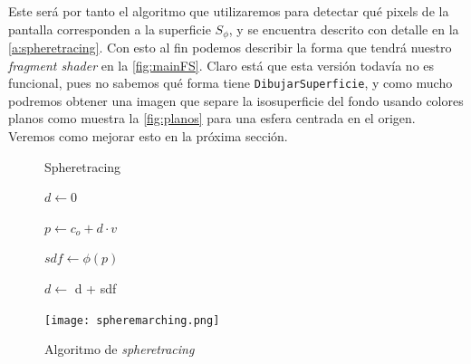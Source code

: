 Este será por tanto el algoritmo que utilizaremos para detectar qué pixels de la pantalla corresponden a la superficie $S_{\phi}$, y se encuentra descrito con detalle en la \autoref{a:spheretracing}. 
Con esto al fin podemos describir la forma que tendrá nuestro \textit{fragment shader} en la \autoref{fig:mainFS}. Claro está que esta versión todavía no es funcional, pues no sabemos qué forma tiene \texttt{DibujarSuperficie}, y como mucho podremos obtener una imagen que separe la isosuperficie del fondo usando colores planos como muestra la \autoref{fig:planos} para una esfera centrada en el origen. Veremos como mejorar esto en la próxima sección.

\begin{figure}[ht!]
    \centering
    \begin{minipage}{0.58\textwidth}
       \begin{algorithm}[H]
            \caption{Spheretracing}
                $d \gets 0$ 
                
                 {
                    $p \gets c_o + d \cdot v$
                    
                    $sdf \gets \phi(p)$
                    
            
                    $d \gets$ d + sdf
            
                }
        \end{algorithm}
    \end{minipage}%
    \hfill
    \begin{minipage}{0.4\textwidth}
        \texttt{[image: spheremarching.png]}
    \end{minipage}
    \caption{Algoritmo de \textit{spheretracing}}
    \label{a:spheretracing}
\end{figure}

